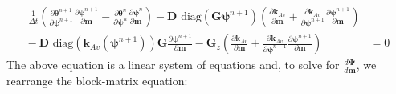 \documentclass[preprint,review,3p,times,onecolumn,authoryear]{elsarticle}
\newcommand{\deriv}[2]{\frac{d #1}{d #2}}
\newcommand{\bfm}{\mathbf{m}}
\newcommand{\bfPsi}{\boldsymbol{\Psi}}
\begin{document}
\begin{align}
\label{eq:richards-timestep-deriv}
\frac{1}{\Delta t}
\left(
    \frac{\partial \boldsymbol{\theta}^{n+1}}{\partial\boldsymbol{\psi}^{n+1}}
    \frac{\partial \boldsymbol{\psi}^{n+1}}{\partial\mathbf{m}}
    -
    \frac{\partial \boldsymbol{\theta}^n}{\partial\boldsymbol{\psi}^n}
    \frac{\partial \boldsymbol{\psi}^n}{\partial\mathbf{m}}
\right)
-
\mathbf{D}
    \text{ diag}\left( \mathbf{G} \boldsymbol{\psi}^{n+1} \right)
    \left(
        \frac{\partial \mathbf{k}_{Av}}{\partial\mathbf{m}} +
        \frac{\partial \mathbf{k}_{Av}}{\partial\boldsymbol{\psi}^{n+1}}
        \frac{\partial \boldsymbol{\psi}^{n+1}}{\partial\mathbf{m}}
    \right)
\nonumber\\
-\
\mathbf{D}
    \text{ diag}\left( \mathbf{k}_{Av}(\boldsymbol{\psi}^{n+1}) \right)
\mathbf{G}
\frac{\partial \boldsymbol{\psi}^{n+1}}{\partial\mathbf{m}}
-
\mathbf{G}_{z}
\left(
    \frac{\partial \mathbf{k}_{Av}}{\partial\mathbf{m}} +
    \frac{\partial \mathbf{k}_{Av}}{\partial\boldsymbol{\psi}^{n+1}}
    \frac{\partial \boldsymbol{\psi}^{n+1}}{\partial\mathbf{m}}
\right)
& = 0
\end{align}
The above equation is a linear system of equations and, to solve for $\deriv{\bfPsi}{\bfm}$, we rearrange the block-matrix equation:
\end{document}

